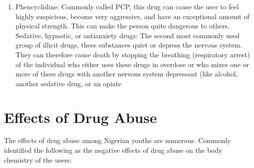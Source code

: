 \documentclass{report}
\begin{document}
\begin{enumerate}
    \item Phencyclidine: Commonly called PCP, this drug can cause the user to feel highly suspicious, become very aggressive, and have an exceptional amount of physical strength. This can make the person quite dangerous to others.
    Sedative, hypnotic, or antianxiety drugs: The second most commonly used group of illicit drugs, these substances quiet or depress the nervous system. They can therefore cause death by stopping the breathing (respiratory arrest) of the individual who either uses these drugs in overdose or who mixes one or more of these drugs with another nervous system depressant (like alcohol, another sedative drug, or an opiate
\end{enumerate}

\section{Effects of Drug Abuse}
The effects of drug abuse among Nigerian youths are numerous. Commonly identified the following as
the negative effects of drug abuse on the body chemistry of the users:
\end{document}

